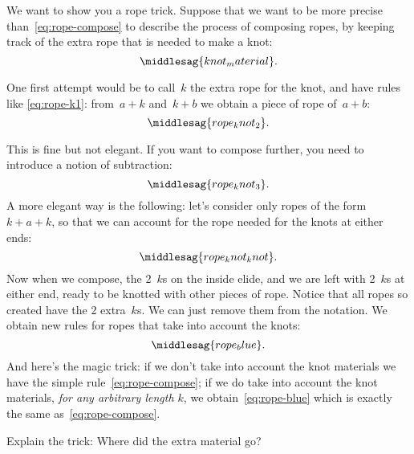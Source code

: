 We want to show you a rope trick.
Suppose that we want to be more precise than~\cref{eq:rope-compose} to describe the process of composing ropes, by keeping track of the extra rope that is needed to make a knot:
%
\begin{equation}
    \label{eq:knot_material}
    \middlesag{knot_material}.
\end{equation}

One first attempt would be to call~$k$ the extra rope for the knot, and have rules like \cref{eq:rope-k1}: from~$a + k$ and~$k + b$ we obtain a piece of rope of~$a+b$:
\begin{equation}
    \label{eq:rope-k1}
    \middlesag{rope_knot_2}.
\end{equation}

%
%
This is fine but not elegant.
If you want to compose further, you need to introduce a notion of subtraction:
%
\begin{equation}
    \label{eq:rope-k2}
    \middlesag{rope_knot_3}.
\end{equation}
%
A more elegant way is the following: let's consider only ropes of the form~$k + a + k$, so that we can account for the rope needed for the knots at either ends:
%
\begin{equation}
    \label{eq:rope-kk}
    \middlesag{rope_knot_knot}.
\end{equation}
%
Now when we compose, the 2~$k$s on the inside elide, and we are left with 2~$k$s at either end, ready to be knotted with other pieces of rope.
Notice that all ropes so created have the 2 extra~$k$s.
We can just remove them from the notation.
We obtain new rules for ropes that take into account the knots:
%
\begin{equation}
    \label{eq:rope-blue}
    \middlesag{rope_blue}.
\end{equation}
%
And here's the magic trick: if we don't take into account the knot materials we have the simple rule~\cref{eq:rope-compose}; if we do take into account the knot materials, \emph{for any arbitrary length $k$}, we obtain~\cref{eq:rope-blue} which is exactly the same as~\cref{eq:rope-compose}.
\begin{exercise}
    Explain the trick: Where did the extra material go?
\end{exercise}
